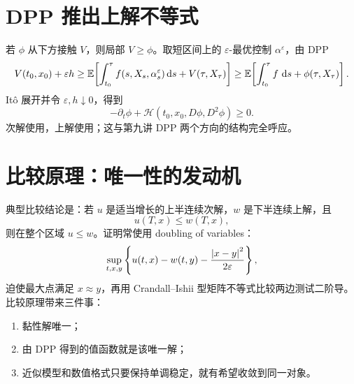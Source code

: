 \section{DPP 推出上解不等式}

若 $\phi$ 从下方接触 $V$，则局部 $V\ge\phi$。取短区间上的 $\varepsilon$-最优控制 $\alpha^\varepsilon$，由 DPP
\[
V(t_0,x_0)+\varepsilon h
\ge\mathbb{E}\!\left[\int_{t_0}^{\tau}f(s,X_s,\alpha_s^\varepsilon)\,\mathrm{d} s
+V(\tau,X_\tau)\right]
\ge\mathbb{E}\!\left[\int_{t_0}^{\tau}f\,\,\mathrm{d} s+\phi(\tau,X_\tau)\right].
\]
Itô 展开并令 $\varepsilon,h\downarrow0$，得到
\[
-\partial_t\phi+\mathscr H(t_0,x_0,D\phi,D^2\phi)\ge0.
\]
次解使用，上解使用；这与第九讲 DPP 两个方向的结构完全呼应。

\begin{center}
\end{center}

\section{比较原理：唯一性的发动机}

典型比较结论是：若 $u$ 是适当增长的上半连续次解，$w$ 是下半连续上解，且
\[
u(T,x)\le w(T,x),
\]
则在整个区域 $u\le w$。证明常使用 doubling of variables：
\[
\sup_{t,x,y}\left\{
u(t,x)-w(t,y)-\frac{\left\lvert x-y\right\rvert^2}{2\varepsilon}
\right\},
\]
迫使最大点满足 $x\approx y$，再用 Crandall--Ishii 型矩阵不等式比较两边测试二阶导。比较原理带来三件事：

\begin{enumerate}
  \item 黏性解唯一；
  \item 由 DPP 得到的值函数就是该唯一解；
  \item 近似模型和数值格式只要保持单调稳定，就有希望收敛到同一对象。
\end{enumerate}


